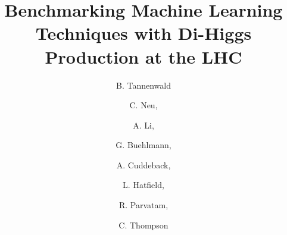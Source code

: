 \documentclass[a4paper,11pt]{article}
\title{\boldmath Benchmarking Machine Learning Techniques with Di-Higgs Production at the LHC}
\author[a]{B. Tannenwald}
\author[a]{C. Neu,}
\author[a]{A. Li,}
\author[a]{G. Buehlmann,}
\author[a]{A. Cuddeback,}
\author[a]{L. Hatfield,}
\author[a]{R. Parvatam,}
\author[a]{C. Thompson}
\affiliation[a]{University of Virginia, 248 McCormick Road, Charlottesville, VA, USA}
\begin{document}
 
\linenumbers
\maketitle
\flushbottom



%
%












%

%

\nocite{*} %
%

\cleardoublepage
{}

%




%
\end{document}
